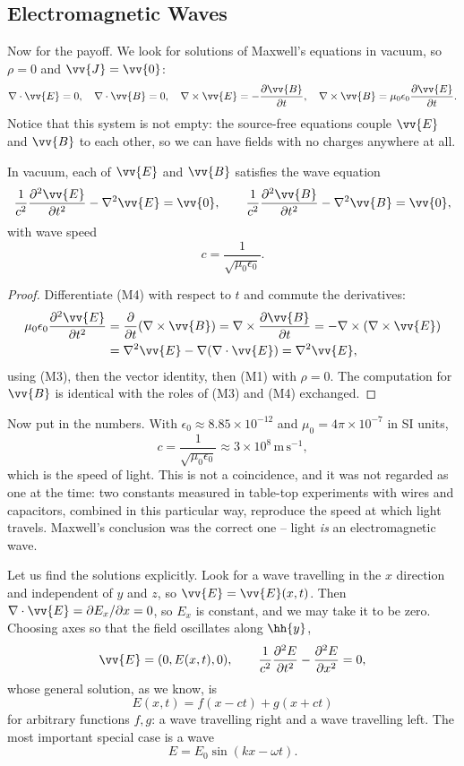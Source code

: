 \subsection{Electromagnetic Waves}

Now for the payoff. We look for solutions of Maxwell's equations in vacuum, so $\rho = 0$ and $\vv{J} = \vv{0}$:
$$
\nabla\cdot\vv{E} = 0,\quad \nabla\cdot\vv{B} = 0,\quad \nabla\times\vv{E} = -\frac{\partial \vv{B}}{\partial t},\quad \nabla\times\vv{B} = \mu_0\epsilon_0 \frac{\partial \vv{E}}{\partial t}.
$$
Notice that this system is not empty: the source-free equations couple $\vv{E}$ and $\vv{B}$ to each other, so we can have fields with no charges anywhere at all.

\begin{theorem}
	In vacuum, each of $\vv{E}$ and $\vv{B}$ satisfies the wave equation
	$$
	\frac{1}{c^2}\frac{\partial^2 \vv{E}}{\partial t^2} - \nabla^2 \vv{E} = \vv{0}, \qquad \frac{1}{c^2}\frac{\partial^2 \vv{B}}{\partial t^2} - \nabla^2 \vv{B} = \vv{0},
	$$
	with wave speed
	$$
	c = \frac{1}{\sqrt{\mu_0 \epsilon_0}}.
	$$
\end{theorem}
\begin{proof}
	Differentiate (M4) with respect to $t$ and commute the derivatives:
	\begin{align*}
		\mu_0\epsilon_0\frac{\partial^2 \vv{E}}{\partial t^2} &= \frac{\partial}{\partial t}(\nabla\times\vv{B}) = \nabla\times \frac{\partial \vv{B}}{\partial t} = -\nabla\times(\nabla\times \vv{E})\\
		&= \nabla^2 \vv{E} - \nabla(\nabla\cdot\vv{E}) = \nabla^2 \vv{E},
	\end{align*}
	using (M3), then the vector identity, then (M1) with $\rho = 0$. The computation for $\vv{B}$ is identical with the roles of (M3) and (M4) exchanged.
\end{proof}

Now put in the numbers. With $\epsilon_0 \approx 8.85\times 10^{-12}$ and $\mu_0 = 4\pi\times 10^{-7}$ in SI units,
$$
c = \frac{1}{\sqrt{\mu_0\epsilon_0}} \approx 3\times 10^8\,\mathrm{m}\,\mathrm{s}^{-1},
$$
which is the speed of light. This is not a coincidence, and it was not regarded as one at the time: two constants measured in table-top experiments with wires and capacitors, combined in this particular way, reproduce the speed at which light travels. Maxwell's conclusion was the correct one -- light \emph{is} an electromagnetic wave.

Let us find the solutions explicitly. Look for a wave travelling in the $x$ direction and independent of $y$ and $z$, so $\vv{E} = \vv{E}(x,t)$. Then $\nabla\cdot\vv{E} = \partial E_x/\partial x = 0$, so $E_x$ is constant, and we may take it to be zero. Choosing axes so that the field oscillates along $\hh{y}$,
$$
\vv{E} = (0, E(x,t), 0), \qquad \frac{1}{c^2}\frac{\partial^2 E}{\partial t^2} - \frac{\partial^2 E}{\partial x^2} = 0,
$$
whose general solution, as we know, is
$$
E(x,t) = f(x - ct) + g(x+ct)
$$
for arbitrary functions $f, g$: a wave travelling right and a wave travelling left. The most important special case is a  wave
$$
E = E_0 \sin(kx - \omega t).
$$

